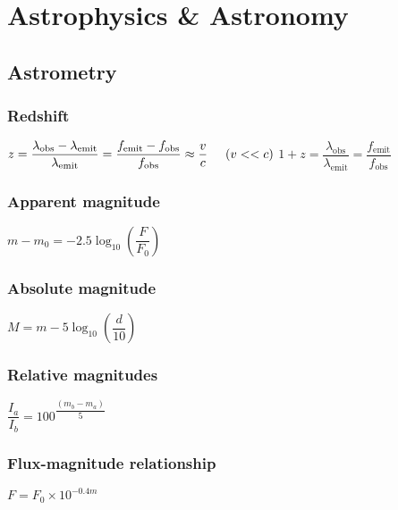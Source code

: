 \chapter{Astrophysics \& Astronomy}

	\section{Astrometry}



\subsection{Redshift}
\begin{itemize}
\itemt \( z = \dfrac{\lambda_\mathrm{obs} - \lambda_\mathrm{emit}}{\lambda_\mathrm{emit}} =\dfrac{f_\mathrm{emit} - f_\mathrm{obs}}{f_\mathrm{obs}} \approx \dfrac{v}{c}\tab[0.5cm] (v<<c) \)
\itemt \( 1+z = \dfrac{\lambda_\mathrm{obs}}{\lambda_\mathrm{emit}} = \dfrac{f_\mathrm{emit}}{f_\mathrm{obs}} \)
\end{itemize}

\subsection{Apparent magnitude}	
\begin{itemize}
\itemt \( m-m_0=-2.5\log_{10} (\dfrac{F}{F_0}) \)
\end{itemize}

\subsection{Absolute magnitude}
\begin{itemize}
\itemt \( M = m - 5 \log_{10} (\dfrac{d}{10}) \)
\end{itemize}

\subsection{Relative magnitudes}
\begin{itemize}
\itemt \( \dfrac{I_a}{I_b} = 100^{\dfrac{(m_b-m_a)}{5}} \)
\end{itemize}

\subsection{Flux-magnitude relationship}
\begin{itemize}
\itemt \( F = F_0\times 10^{-0.4m} \)
\end{itemize}			

